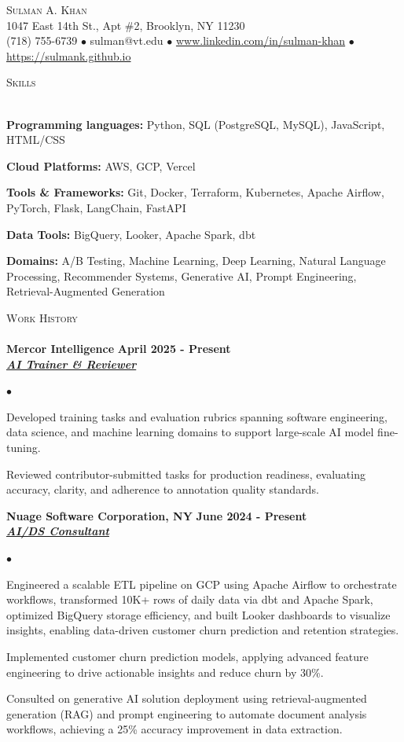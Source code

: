 \documentclass{article}
\newcommand{\lineunder}{\vspace*{-8pt} \\ \hspace*{-18pt} \hrulefill \\}
\newcommand{\header}[1]{{\hspace*{-15pt}\vspace*{6pt} \textsc{#1}} \vspace*{-6pt} \lineunder}
\newcommand{\employer}[3]{{ \textbf{#1} \hfill \textbf{#2}\\ \underline{\textbf{\emph{#3}}}\\  }}
\newcommand{\contact}[3]{
\vspace*{-8pt}
\begin{center}
{\LARGE \scshape {#1}}\\
#2  \\
#3
\end{center}
\vspace*{-8pt}
}
\newenvironment{achievements}{\begin{list}{$\bullet$}{\topsep 0pt \itemsep -2pt}}{\vspace*{4pt}\end{list}}
\newenvironment{achievementskillsone}{\begin{list}{}{\topsep 0pt \itemsep -2pt}}{\vspace*{4pt}\end{list}}
\begin{document}
\small
\smallskip
\vspace*{-44pt}

\contact{Sulman A. Khan}
{1047 East 14th St., Apt \#2, Brooklyn, NY 11230}
{(718) 755-6739 $\bullet$ sulman@vt.edu  $\bullet$ \href{https://www.linkedin.com/in/sulman-khan}{www.linkedin.com/in/sulman-khan}
 $\bullet$ \href{https://sulmank.github.io}{https://sulmank.github.io}
 }

\header{Skills}

\begin{achievementskillsone}
\item \hspace{-27pt} \textbf{Programming languages:} Python, SQL (PostgreSQL, MySQL), JavaScript, HTML/CSS
\item \hspace{-27pt} \textbf{Cloud Platforms:} AWS, GCP, Vercel
\item \hspace{-27pt} \textbf{Tools \& Frameworks:} Git, Docker, Terraform, Kubernetes, Apache Airflow, PyTorch, Flask, LangChain, FastAPI
\item \hspace{-27pt} \textbf{Data Tools:} BigQuery, Looker, Apache Spark, dbt
\item \hspace{-27pt} \textbf{Domains:} A/B Testing, Machine Learning, Deep Learning, Natural Language Processing, Recommender Systems, Generative AI, Prompt Engineering, Retrieval-Augmented Generation
\end{achievementskillsone}


\header{Work History}
\employer{Mercor Intelligence}{April 2025 - Present}{AI Trainer \& Reviewer}
	\begin{achievements}
    \item Developed training tasks and evaluation rubrics spanning software engineering, data science, and machine learning domains to support large-scale AI model fine-tuning.
    \item Reviewed contributor-submitted tasks for production readiness, evaluating accuracy, clarity, and adherence to annotation quality standards.
    \end{achievements}

\employer{Nuage Software Corporation, NY}{June 2024 - Present}{AI/DS Consultant}
	\begin{achievements}
    \item Engineered a scalable ETL pipeline on GCP using Apache Airflow to orchestrate workflows, transformed 10K+ rows of daily data via dbt and Apache Spark, optimized BigQuery storage efficiency, and built Looker dashboards to visualize insights, enabling data-driven customer churn prediction and retention strategies.
    \item Implemented customer churn prediction models, applying advanced feature engineering to drive actionable insights and reduce churn by 30\%.
    \item Consulted on generative AI solution deployment using retrieval-augmented generation (RAG) and prompt engineering to automate document analysis workflows, achieving a 25\% accuracy improvement in data extraction.
    \end{achievements}
\end{document}

